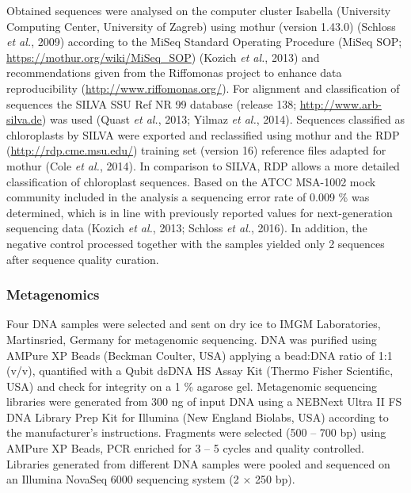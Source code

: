 \documentclass[12pt,]{article}
\begin{document}
Obtained sequences were analysed on the computer cluster Isabella
(University Computing Center, University of Zagreb) using mothur
(version 1.43.0) (Schloss \emph{et al.}, 2009) according to the MiSeq
Standard Operating Procedure (MiSeq SOP;
\url{https://mothur.org/wiki/MiSeq_SOP}) (Kozich \emph{et al.}, 2013)
and recommendations given from the Riffomonas project to enhance data
reproducibility (\url{http://www.riffomonas.org/}). For alignment and
classification of sequences the SILVA SSU Ref NR 99 database (release
138; \url{http://www.arb-silva.de}) was used (Quast \emph{et al.}, 2013;
Yilmaz \emph{et al.}, 2014). Sequences classified as chloroplasts by
SILVA were exported and reclassified using mothur and the RDP
(\url{http://rdp.cme.msu.edu/}) training set (version 16) reference
files adapted for mothur (Cole \emph{et al.}, 2014). In comparison to
SILVA, RDP allows a more detailed classification of chloroplast
sequences. Based on the ATCC MSA-1002 mock community included in the
analysis a sequencing error rate of 0.009 \si{\percent} was determined,
which is in line with previously reported values for next-generation
sequencing data (Kozich \emph{et al.}, 2013; Schloss \emph{et al.},
2016). In addition, the negative control processed together with the
samples yielded only 2 sequences after sequence quality curation.

\hypertarget{metagenomics}{%
\subsubsection{Metagenomics}\label{metagenomics}}

Four DNA samples were selected and sent on dry ice to IMGM Laboratories,
Martinsried, Germany for metagenomic sequencing. DNA was purified using
AMPure XP Beads (Beckman Coulter, USA) applying a bead:DNA ratio of 1:1
(v/v), quantified with a Qubit dsDNA HS Assay Kit (Thermo Fisher
Scientific, USA) and check for integrity on a 1 \si{\percent} agarose
gel. Metagenomic sequencing libraries were generated from 300 \si{\ng}
of input DNA using a NEBNext Ultra II FS DNA Library Prep Kit for
Illumina (New England Biolabs, USA) according to the manufacturer's
instructions. Fragments were selected (500 -- 700 bp) using AMPure XP
Beads, PCR enriched for 3 -- 5 cycles and quality controlled. Libraries
generated from different DNA samples were pooled and sequenced on an
Illumina NovaSeq 6000 sequencing system (2 × 250 bp).
\end{document}

